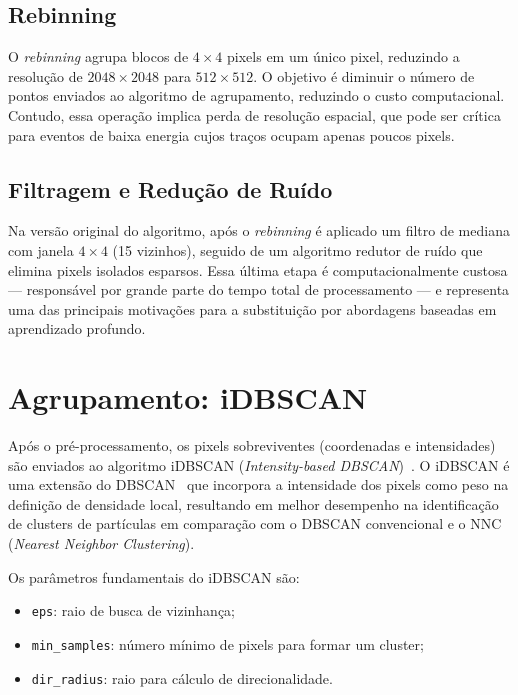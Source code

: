 \documentclass[
       oneside,
       english,
       brazil
       ]{abntbibufjf}
\begin{document}
\subsection{Rebinning}

O \textit{rebinning} agrupa blocos de $4 \times 4$ pixels em um único pixel,
reduzindo a resolução de $2048 \times 2048$ para $512 \times 512$. O objetivo
é diminuir o número de pontos enviados ao algoritmo de agrupamento, reduzindo
o custo computacional. Contudo, essa operação implica perda de resolução
espacial, que pode ser crítica para eventos de baixa energia cujos traços
ocupam apenas poucos pixels.

\subsection{Filtragem e Redução de Ruído}

Na versão original do algoritmo, após o \textit{rebinning} é aplicado um
filtro de mediana com janela $4 \times 4$ (15 vizinhos), seguido de um
algoritmo redutor de ruído que elimina pixels isolados esparsos. Essa última
etapa é computacionalmente custosa — responsável por grande parte do tempo
total de processamento — e representa uma das principais motivações para a
substituição por abordagens baseadas em aprendizado profundo.

\section{Agrupamento: iDBSCAN}
\label{sec:idbscan}

Após o pré-processamento, os pixels sobreviventes (coordenadas e intensidades)
são enviados ao algoritmo iDBSCAN (\textit{Intensity-based
DBSCAN})~\cite{baracchini2020density}. O iDBSCAN é uma extensão do
DBSCAN~\cite{dbscan1996} que incorpora a intensidade dos pixels como peso na
definição de densidade local, resultando em melhor desempenho na identificação
de clusters de partículas em comparação com o DBSCAN convencional e o NNC
(\textit{Nearest Neighbor Clustering}).

Os parâmetros fundamentais do iDBSCAN são:
\begin{itemize}
    \item \texttt{eps}: raio de busca de vizinhança;
    \item \texttt{min\_samples}: número mínimo de pixels para formar um
    cluster;
    \item \texttt{dir\_radius}: raio para cálculo de direcionalidade.
\end{itemize}
\end{document}
